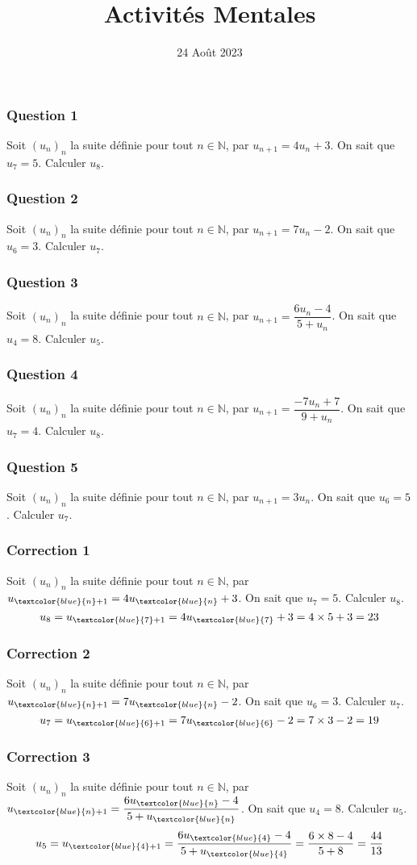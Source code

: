 \documentclass[15pt, mathserif]{beamer}
\title{Activités Mentales}
\date{24 Août 2023}
\newcommand{\N}{\mathbb{N}}			%
\begin{document}
\begin{frame}
    \titlepage
\end{frame}

\begin{frame} 
	\frametitle{Question 1}
Soit $(u_n)_n$ la suite définie pour tout $n \in \N$, par $u_{n+1}=4u_n+3$. On sait que $u_{7}=5$. Calculer $u_{8}$.\end{frame}


\begin{frame} 
	\frametitle{Question 2}
Soit $(u_n)_n$ la suite définie pour tout $n \in \N$, par $u_{n+1}=7u_n-2$. On sait que $u_{6}=3$. Calculer $u_{7}$.\end{frame}


\begin{frame} 
	\frametitle{Question 3}
Soit $(u_n)_n$ la suite définie pour tout $n \in \N$, par $u_{n+1}=\dfrac{6u_n-4}{5+u_n}$. On sait que $u_{4}=8$. Calculer $u_{5}$.\end{frame}


\begin{frame} 
	\frametitle{Question 4}
Soit $(u_n)_n$ la suite définie pour tout $n \in \N$, par $u_{n+1}=\dfrac{-7u_n+7}{9+u_n}$. On sait que $u_{7}=4$. Calculer $u_{8}$.\end{frame}


\begin{frame} 
	\frametitle{Question 5}
Soit $(u_n)_n$ la suite définie pour tout $n \in \N$, par $u_{n+1}=3u_n$. On sait que $u_{6}=5$. Calculer $u_{7}$.\end{frame}


\begin{frame}
\vspace{-10mm}
	\frametitle{Correction 1}
Soit $(u_n)_n$ la suite définie pour tout $n \in \N$, par $u_{\textcolor{blue}{n}+1}=4u_{\textcolor{blue}{n}}+3$. On sait que $u_{7}=5$. Calculer $u_{8}$. $$u_{8}=u_{\textcolor{blue}{7}+1}=4u_{\textcolor{blue}{7} }+3=4\times 5+3=23$$\end{frame}


\begin{frame}
\vspace{-10mm}
	\frametitle{Correction 2}
Soit $(u_n)_n$ la suite définie pour tout $n \in \N$, par $u_{\textcolor{blue}{n}+1}=7u_{\textcolor{blue}{n}}-2$. On sait que $u_{6}=3$. Calculer $u_{7}$. $$u_{7}=u_{\textcolor{blue}{6}+1}=7u_{\textcolor{blue}{6} }-2=7\times 3-2=19$$\end{frame}


\begin{frame}
\vspace{-10mm}
	\frametitle{Correction 3}
Soit $(u_n)_n$ la suite définie pour tout $n \in \N$, par $u_{\textcolor{blue}{n}+1}=\dfrac{6u_{\textcolor{blue}{n}}-4}{5+u_{\textcolor{blue}{n}}}$. On sait que $u_{4}=8$. Calculer $u_{5}$. $$u_{5}=u_{\textcolor{blue}{4}+1}= \dfrac{6u_{\textcolor{blue}{4} }-4}{5+u_{\textcolor{blue}{4} } } = \dfrac{6\times 8-4}{5+8}=\dfrac{44}{13}$$\end{frame}
\end{document}
